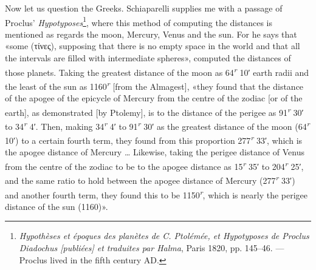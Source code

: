 \documentclass[11pt]{article}
\begin{document}
\par Now let us question the Greeks. Schiaparelli supplies me with a passage of Proclus' \emph{Hypotyposes}\footnote{\emph{Hypothèses et époques des planètes de C. Ptolémée, et Hypotyposes de Proclus Diadochus [publiées] et traduites par Halma}, Paris 1820, pp. 145–46. — Proclus lived in the fifth century AD.}, where this method of computing the distances is mentioned as regards the moon, Mercury, Venus and the sun. For he says that «some ({\greekfont τίνες}), supposing that there is no empty space in the world and that all the intervals are filled with intermediate spheres», computed the distances of those planets. Taking the greatest distance of the moon as 64\textsuperscript{\itshape r} 10′ earth radii and the least of the sun as 1160\textsuperscript{\itshape r} [from the Almagest], «they found that the distance of the apogee of the epicycle of Mercury from the centre of the zodiac [or of the earth], as demonstrated [by Ptolemy], is to the distance of the perigee as 91\textsuperscript{\itshape r} 30′ to 34\textsuperscript{\itshape r} 4′. Then, making 34\textsuperscript{\itshape r} 4′ to 91\textsuperscript{\itshape r} 30′ as the greatest distance of the moon (64\textsuperscript{\itshape r} 10′) to a certain fourth term, they found from this proportion 277\textsuperscript{\itshape r} 33′, which is the apogee distance of Mercury … Likewise, taking the perigee distance of Venus from the centre of the zodiac to be to the apogee distance as 15\textsuperscript{\itshape r} 35′ to 204\textsuperscript{\itshape r} 25′, and the same ratio to hold between the apogee distance of Mercury (277\textsuperscript{\itshape r} 33′) and another fourth term, they found this to be 1150\textsuperscript{\itshape r}, which is nearly the perigee distance of the sun (1160)».\par
\end{document}
